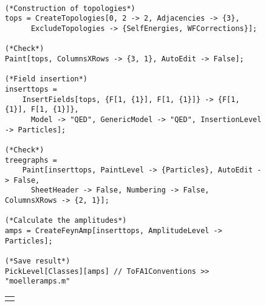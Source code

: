\begin{figure}[H]
\begin{footnotesize}
\begin{verbatim}

(*Construction of topologies*)
tops = CreateTopologies[0, 2 -> 2, Adjacencies -> {3}, 
      ExcludeTopologies -> {SelfEnergies, WFCorrections}];

(*Check*)
Paint[tops, ColumnsXRows -> {3, 1}, AutoEdit -> False];

(*Field insertion*)
inserttops = 
    InsertFields[tops, {F[1, {1}], F[1, {1}]} -> {F[1, {1}], F[1, {1}]}, 
      Model -> "QED", GenericModel -> "QED", InsertionLevel -> Particles];

(*Check*)
treegraphs = 
    Paint[inserttops, PaintLevel -> {Particles}, AutoEdit -> False, 
      SheetHeader -> False, Numbering -> False, ColumnsXRows -> {2, 1}];

(*Calculate the amplitudes*)
amps = CreateFeynAmp[inserttops, AmplitudeLevel -> Particles];

(*Save result*)
PickLevel[Classes][amps] // ToFA1Conventions >> "moelleramps.m"

\end{verbatim}
\end{footnotesize}
\begin{tabular*}{0.8\textwidth}{c}\hhline\end{tabular*}
\end{figure}

